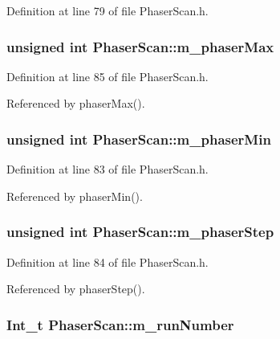 Definition at line 79 of file PhaserScan.h.\hypertarget{classPhaserScan_ab47dd8cf441f9c713aa8c3e2251b382d}{
\subsubsection[{m\_\-phaserMax}]{\setlength{\rightskip}{0pt plus 5cm}unsigned int {\bf PhaserScan::m\_\-phaserMax}}}
\label{classPhaserScan_ab47dd8cf441f9c713aa8c3e2251b382d}


Definition at line 85 of file PhaserScan.h.

Referenced by phaserMax().\hypertarget{classPhaserScan_a65f83dd6b9e6c62cd828ef7b094c0361}{
\subsubsection[{m\_\-phaserMin}]{\setlength{\rightskip}{0pt plus 5cm}unsigned int {\bf PhaserScan::m\_\-phaserMin}}}
\label{classPhaserScan_a65f83dd6b9e6c62cd828ef7b094c0361}


Definition at line 83 of file PhaserScan.h.

Referenced by phaserMin().\hypertarget{classPhaserScan_aed5bcb2582744f73a6189544c272213b}{
\subsubsection[{m\_\-phaserStep}]{\setlength{\rightskip}{0pt plus 5cm}unsigned int {\bf PhaserScan::m\_\-phaserStep}}}
\label{classPhaserScan_aed5bcb2582744f73a6189544c272213b}


Definition at line 84 of file PhaserScan.h.

Referenced by phaserStep().\hypertarget{classPhaserScan_a158add7f69adba5e4623afda6c9b31e2}{
\subsubsection[{m\_\-runNumber}]{\setlength{\rightskip}{0pt plus 5cm}Int\_\-t {\bf PhaserScan::m\_\-runNumber}}}
\label{classPhaserScan_a158add7f69adba5e4623afda6c9b31e2}


